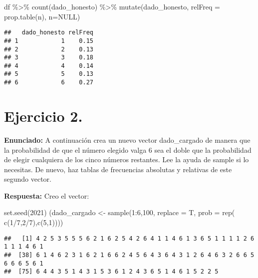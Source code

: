 \documentclass[
]{article}
\newenvironment{Shaded}{\begin{snugshade}}{\end{snugshade}}
\newcommand{\AttributeTok}[1]{\textcolor[rgb]{0.77,0.63,0.00}{#1}}
\newcommand{\ConstantTok}[1]{\textcolor[rgb]{0.00,0.00,0.00}{#1}}
\newcommand{\DecValTok}[1]{\textcolor[rgb]{0.00,0.00,0.81}{#1}}
\newcommand{\FunctionTok}[1]{\textcolor[rgb]{0.00,0.00,0.00}{#1}}
\newcommand{\NormalTok}[1]{#1}
\newcommand{\OtherTok}[1]{\textcolor[rgb]{0.56,0.35,0.01}{#1}}
\newcommand{\SpecialCharTok}[1]{\textcolor[rgb]{0.00,0.00,0.00}{#1}}
\begin{document}
\begin{Shaded}
\begin{Highlighting}[]
\NormalTok{      df }\SpecialCharTok{\%\textgreater{}\%} 
        \FunctionTok{count}\NormalTok{(dado\_honesto) }\SpecialCharTok{\%\textgreater{}\%}
          \FunctionTok{mutate}\NormalTok{(dado\_honesto, }\AttributeTok{relFreq =} \FunctionTok{prop.table}\NormalTok{(n), }\AttributeTok{n=}\ConstantTok{NULL}\NormalTok{)}
\end{Highlighting}
\end{Shaded}

\begin{verbatim}
##   dado_honesto relFreq
## 1            1    0.15
## 2            2    0.13
## 3            3    0.18
## 4            4    0.14
## 5            5    0.13
## 6            6    0.27
\end{verbatim}

\hypertarget{ejercicio-2.}{%
\section{Ejercicio 2.}\label{ejercicio-2.}}

\textbf{Enunciado:} A continuación crea un nuevo vector dado\_cargado de
manera que la probabilidad de que el número elegido valga 6 sea el doble
que la probabilidad de elegir cualquiera de los cinco números restantes.
Lee la ayuda de sample si lo necesitas. De nuevo, haz tablas de
frecuencias absolutas y relativas de este segundo vector.

\textbf{Respuesta:} Creo el vector:

\begin{Shaded}
\begin{Highlighting}[]
\FunctionTok{set.seed}\NormalTok{(}\DecValTok{2021}\NormalTok{)}
\NormalTok{(dado\_cargado }\OtherTok{\textless{}{-}} \FunctionTok{sample}\NormalTok{(}\DecValTok{1}\SpecialCharTok{:}\DecValTok{6}\NormalTok{,}\DecValTok{100}\NormalTok{, }\AttributeTok{replace =}\NormalTok{ T, }\AttributeTok{prob =} \FunctionTok{rep}\NormalTok{( }\FunctionTok{c}\NormalTok{(}\DecValTok{1}\SpecialCharTok{/}\DecValTok{7}\NormalTok{,}\DecValTok{2}\SpecialCharTok{/}\DecValTok{7}\NormalTok{),}\FunctionTok{c}\NormalTok{(}\DecValTok{5}\NormalTok{,}\DecValTok{1}\NormalTok{))))}
\end{Highlighting}
\end{Shaded}

\begin{verbatim}
##   [1] 4 2 5 3 5 5 5 6 2 1 6 2 5 4 2 6 4 1 1 4 6 1 3 6 5 1 1 1 1 2 6 1 1 1 4 6 1
##  [38] 6 1 4 6 2 3 1 6 2 1 6 6 2 4 5 6 4 3 6 4 3 1 2 6 4 6 3 2 6 6 5 6 6 6 5 6 1
##  [75] 6 4 4 3 5 1 4 3 1 5 3 6 1 2 4 3 6 5 1 4 6 1 5 2 2 5
\end{verbatim}
\end{document}

